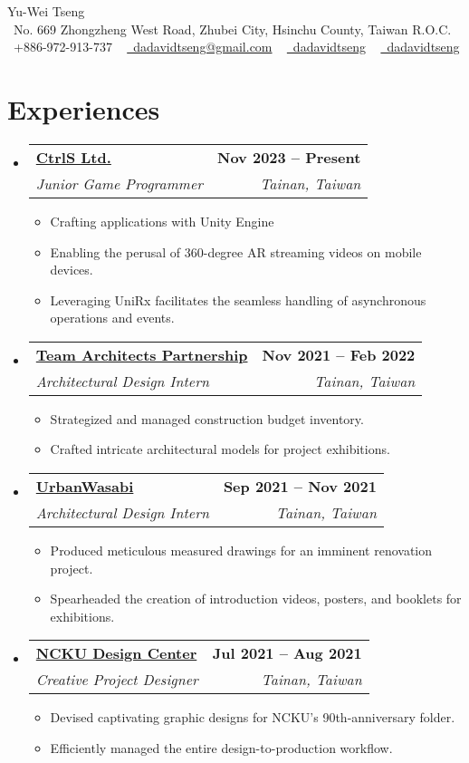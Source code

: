 \documentclass[letterpaper,11pt]{article}
\makeatletter
\newcommand{\resumeItem}[1]{
    \item\small{
            {#1 \vspace{-2pt}}
    }
}
\newcommand{\resumeSubheading}[4]{
    \vspace{-2pt}\item
    \begin{tabular*}{1.0\textwidth}[t]{l@{\extracolsep{\fill}}r}
    \textbf{#1} & \textbf{\small #2} \\
    \textit{\small#3} & \textit{\small #4} \\
    \end{tabular*}\vspace{-7pt}
}
\newcommand{\resumeSubHeadingListStart}{\begin{itemize}[leftmargin=0.0in, label={}]}
\newcommand{\resumeSubHeadingListEnd}{\end{itemize}}
\newcommand{\resumeItemListStart}{\begin{itemize}}
\newcommand{\resumeItemListEnd}{\end{itemize}\vspace{-5pt}}
\makeatother
\begin{document}
\begin{center}
{\Huge Yu-Wei Tseng} \\ \vspace{1pt}
\small
\faHouseUser\ No. 669 Zhongzheng West Road, Zhubei City, Hsinchu County, Taiwan R.O.C. \\ \vspace{1pt}
\raisebox{-0.1\height}\faPhone\ +886-972-913-737 ~
\href{mailto:dadavidtseng@gmail.com}{\faEnvelope\ dadavidtseng@gmail.com} ~
\href{https://linkedin.com/in/dadavidtseng}{\faLinkedin\ dadavidtseng}  ~
\href{https://github.com/dadavidtseng}{\faGithub\ dadavidtseng}
\vspace{-8pt}
\end{center}



\section{Experiences}
\resumeSubHeadingListStart
\resumeSubheading
{\href{https://www.ctrls1890.com/}{CtrlS Ltd.}}{Nov 2023 -- Present}{Junior Game Programmer}{Tainan, Taiwan}
\resumeItemListStart
\resumeItem {Crafting applications with Unity Engine}
\resumeItem {Enabling the perusal of 360-degree AR streaming videos on mobile devices.}
\resumeItem {Leveraging UniRx facilitates the seamless handling of asynchronous operations and events.}
\resumeItemListEnd

\resumeSubheading
{\href{https://www.tap-arch.tw//en}
{Team Architects Partnership}}{Nov 2021 -- Feb 2022}
{Architectural Design Intern}{Tainan, Taiwan}
\resumeItemListStart
\resumeItem {Strategized and managed construction budget inventory.}
\resumeItem {Crafted intricate architectural models for project exhibitions.}
\resumeItemListEnd

\resumeSubheading
{\href{https://www.urbanwasabi.com.tw/}
{UrbanWasabi}}{Sep 2021 -- Nov 2021}
{Architectural Design Intern}{Tainan, Taiwan}
\resumeItemListStart
\resumeItem {Produced meticulous measured drawings for an imminent renovation project.}
\resumeItem {Spearheaded the creation of introduction videos, posters, and booklets for exhibitions.}
\resumeItemListEnd

\resumeSubheading
{\href{https://www.nckudc.com.tw/}
{NCKU Design Center}}{Jul 2021 -- Aug 2021}
{Creative Project Designer}{Tainan, Taiwan}
\resumeItemListStart
\resumeItem {Devised captivating graphic designs for NCKU's 90th-anniversary folder.}
\resumeItem {Efficiently managed the entire design-to-production workflow.}
\resumeItemListEnd
\resumeSubHeadingListEnd
\end{document}
